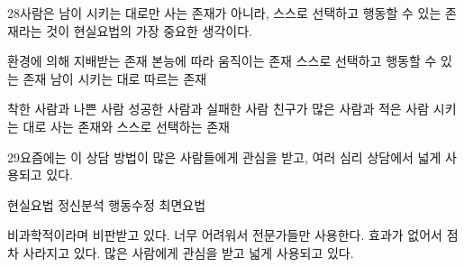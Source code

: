\documentclass[fs85,seriesRus]{korfarm-base}
\begin{document}
\begin{kfSentenceUnit}{28}{사람은 남이 시키는 대로만 사는 존재가 아니라, 스스로 선택하고 행동할 수 있는 존재라는 것이 현실요법의 가장 중요한 생각이다.}
\begin{kfChoices}
\kfChoice 환경에 의해 지배받는 존재
\kfChoice 본능에 따라 움직이는 존재
\kfChoice 스스로 선택하고 행동할 수 있는 존재
\kfChoice 남이 시키는 대로 따르는 존재
\end{kfChoices}
\begin{kfChoices}
\kfChoice 착한 사람과 나쁜 사람
\kfChoice 성공한 사람과 실패한 사람
\kfChoice 친구가 많은 사람과 적은 사람
\kfChoice 시키는 대로 사는 존재와 스스로 선택하는 존재
\end{kfChoices}
\end{kfSentenceUnit}

\begin{kfSentenceUnit}{29}{요즘에는 이 상담 방법이 많은 사람들에게 관심을 받고, 여러 심리 상담에서 넓게 사용되고 있다.}
\begin{kfChoices}
\kfChoice 현실요법
\kfChoice 정신분석
\kfChoice 행동수정
\kfChoice 최면요법
\end{kfChoices}
\begin{kfChoices}
\kfChoice 비과학적이라며 비판받고 있다.
\kfChoice 너무 어려워서 전문가들만 사용한다.
\kfChoice 효과가 없어서 점차 사라지고 있다.
\kfChoice 많은 사람에게 관심을 받고 넓게 사용되고 있다.
\end{kfChoices}
\end{kfSentenceUnit}

\kfEndMC
\end{document}
